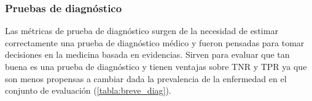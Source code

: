 
\subsubsection{Pruebas de diagnóstico}

Las métricas de prueba de diagnóstico surgen de la necesidad de estimar
correctamente una prueba de diagnóstico médico y fueron pensadas para tomar decisiones en la
medicina basada en evidencias. Sirven para evaluar que tan buena es una prueba de diagnóstico
y tienen ventajas sobre TNR y TPR ya que son menos propensas a cambiar dada la prevalencia de
la enfermedad en el conjunto de evaluación (\autoref{tabla:breve_diag}). 

